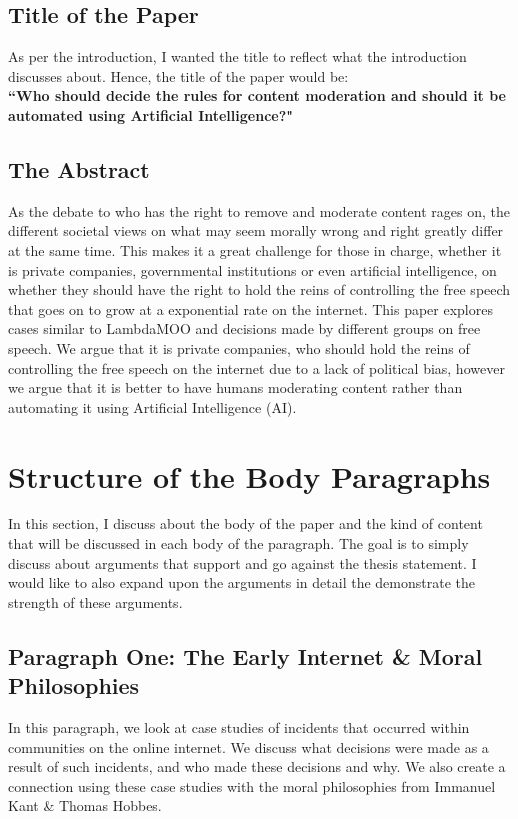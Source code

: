 \documentclass[a4paper]{article}
\begin{document}
\subsection{Title of the Paper}
As per the introduction, I wanted the title to reflect what the introduction discusses about. Hence, the title of the
paper would be: \\

\textbf{``Who should decide the rules for content moderation and should it be automated using Artificial 
Intelligence?"}

\subsection{The Abstract}
As the debate to who has the right to remove  and moderate content rages on, the different societal views on what may seem morally wrong and 
right greatly differ at the same time. This makes it a great challenge for those in charge, whether it is private 
companies, governmental institutions or even artificial intelligence, on whether they should have the right to hold 
the reins of controlling the free speech that goes on to grow at a exponential rate on the internet. This paper 
explores cases similar to LambdaMOO and decisions made by different groups  on free speech. We argue that it is 
private companies, who should hold the reins of controlling the free speech on the internet  due to a lack of 
political bias, however we argue that it is better to have humans moderating content rather than automating it 
using Artificial Intelligence (AI).

\section{Structure of the Body Paragraphs}
In this section, I discuss about the body of the paper and the kind of content that will be discussed in each body
of the paragraph. The goal is to simply discuss about arguments that support and go against the thesis statement. 
I would like to also expand upon the arguments in detail the demonstrate the strength of these arguments.

\subsection{Paragraph One: The Early Internet \& Moral Philosophies}
In this paragraph, we look at case studies of incidents that occurred within communities on the online internet.
We discuss what decisions were made as a result of such incidents, and who made these decisions and why. We also
create a connection using these case studies with the moral philosophies from Immanuel Kant \& Thomas Hobbes. \\
\end{document}
